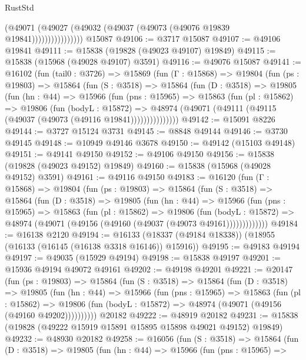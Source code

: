 \begin{lexlean}{RustStd}
\begin{coremodule}
                        (@49071
                          (@49027 (@49032 (@49037 (@49073 (@49076 @19839 @19841))))))))))))))))
    @15087
@49106 := @3717 @15087
@49107 := @49106 @19841
@49111 := @15838 (@19828 (@49023 @49107) @19849)
@49115 := @15838 (@15968 (@49028 @49107) @3591)
@49116 := @49076 @15087
@49141 := @16102
    (fun (tail0 : @3726) =>
    @15869
      (fun (Γ : @15868) =>
      @19804
        (fun (ps : @19803) =>
        @15864
          (fun (S : @3518) =>
          @15864
            (fun (D : @3518) =>
            @19805
              (fun (hn : @44) =>
              @15966
                (fun (pns : @15965) =>
                @15863
                  (fun (pl : @15862) =>
                  @19806
                    (fun (bodyL : @15872) =>
                    @48974 (@49071 (@49111 (@49115 (@49037 (@49073 (@49116 @19841)))))))))))))))
@49142 := @15091 @8226
@49144 := @3727 @15124 @3731
@49145 := @8848 @49144
@49146 := @3730 @49145
@49148 := @10949 @49146 @3678
@49150 := @49142 (@15103 @49148)
@49151 := @49141 @49150
@49152 := @49106 @49150
@49156 := @15838 (@19828 (@49023 @49152) @19849)
@49160 := @15838 (@15968 (@49028 @49152) @3591)
@49161 := @49116 @49150
@49183 := @16120
    (fun (Γ : @15868) =>
    @19804
      (fun (ps : @19803) =>
      @15864
        (fun (S : @3518) =>
        @15864
          (fun (D : @3518) =>
          @19805
            (fun (hn : @44) =>
            @15966
              (fun (pns : @15965) =>
              @15863
                (fun (pl : @15862) =>
                @19806
                  (fun (bodyL : @15872) =>
                  @48974 (@49071 (@49156 (@49160 (@49037 (@49073 @49161)))))))))))))
@49184 := @16138 @2120
@49194 := @16133 (@18337 (@49184 @18338)) (@18955 (@16133 (@16145 (@16138 @3318 @16146)) @15916))
@49195 := @49183 @49194
@49197 := @49035 (@15929 @49194)
@49198 := @15838 @49197
@49201 := @15936 @49194 @49072 @49161
@49202 := @49198 @49201
@49221 := @20147
    (fun (ps : @19803) =>
    @15864
      (fun (S : @3518) =>
      @15864
        (fun (D : @3518) =>
        @19805
          (fun (hn : @44) =>
          @15966
            (fun (pns : @15965) =>
            @15863
              (fun (pl : @15862) =>
              @19806 (fun (bodyL : @15872) => @48974 (@49071 (@49156 (@49160 @49202))))))))))
    @20182
@49222 := @48919 @20182
@49231 := @15838 (@19828 (@49222 @15919 @15891 @15895 @15898 @49021 @49152) @19849)
@49232 := @48930 @20182
@49258 := @16056
    (fun (S : @3518) =>
    @15864
      (fun (D : @3518) =>
      @19805
        (fun (hn : @44) =>
        @15966
          (fun (pns : @15965) =>

\end{coremodule}
\end{lexlean}
